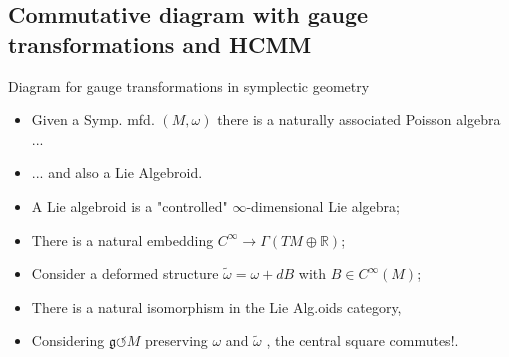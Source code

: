 \documentclass[handout,10pt]{beamer}
\begin{document}
\subsection{Commutative diagram with gauge transformations and HCMM}
\begin{frame}{Diagram for gauge transformations in symplectic geometry}
	\vfill
	
	\begin{itemize}
		\item<2-> Given a Symp. mfd. $(M,\omega)$ there is a naturally associated Poisson algebra ...
		\item<3-> ... and also a Lie Algebroid.
		\item<4-> A Lie algebroid is a "controlled" $\infty$-dimensional Lie algebra;
		\item<5-> There is a natural embedding $C^\infty \to \Gamma(TM\oplus\mathbb{R})$;
		\item<6-> Consider a deformed structure $\tilde{\omega}= \omega + d B$ with $B\in C^\infty(M)$;
		\item<7-> There is a natural isomorphism in the Lie Alg.oids category,
		\item<8-> Considering $\mathfrak{g}\circlearrowleft M$ preserving $\omega$ and $\tilde{\omega}$ , \alert{the central square commutes!}.
	\end{itemize}
\end{frame}
\end{document}
